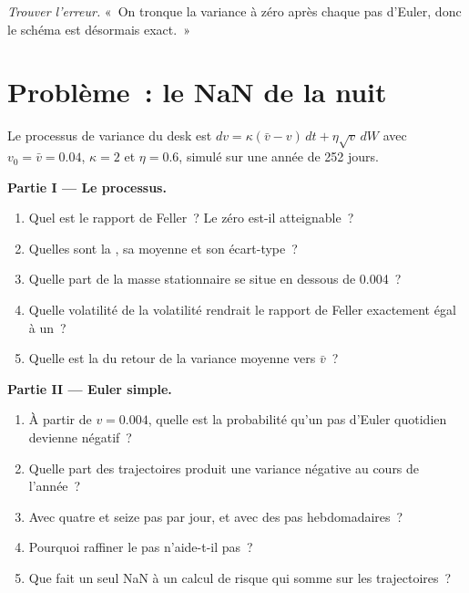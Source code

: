 \begin{exercise}[$\star\star\star$]\label{exo:qm:stochastic-differential-equations:8}
\emph{Trouver l'erreur.} «~On tronque la variance à zéro après chaque pas d'Euler, donc le schéma est
désormais exact.~»
\end{exercise}

\section{Problème~: le NaN de la nuit}

\begin{problem}\label{pb:qm:stochastic-differential-equations:1}
Le processus de variance du desk est $dv = \kappa(\bar v - v)\,dt + \eta\sqrt v\,dW$ avec $v_0 = \bar v = 0.04$,
$\kappa = 2$ et $\eta = 0.6$, simulé sur une année de 252 jours.

\medskip\noindent\textbf{Partie I --- Le processus.}
\begin{enumerate}
\item Quel est le rapport de Feller~? Le zéro est-il atteignable~?
\item Quelles sont la , sa moyenne et son écart-type~?
\item Quelle part de la masse stationnaire se situe en dessous de 0.004~?
\item Quelle volatilité de la volatilité rendrait le rapport de Feller exactement égal à un~?
\item Quelle est la  du retour de la variance moyenne vers $\bar v$~?
\end{enumerate}

\medskip\noindent\textbf{Partie II --- Euler simple.}
\begin{enumerate}[resume]
\item À partir de $v = 0.004$, quelle est la probabilité qu'un pas d'Euler quotidien devienne négatif~?
\item Quelle part des trajectoires produit une variance négative au cours de l'année~?
\item Avec quatre et seize pas par jour, et avec des pas hebdomadaires~?
\item Pourquoi raffiner le pas n'aide-t-il pas~?
\item Que fait un seul NaN à un calcul de risque qui somme sur les trajectoires~?
\end{enumerate}


\end{problem}
